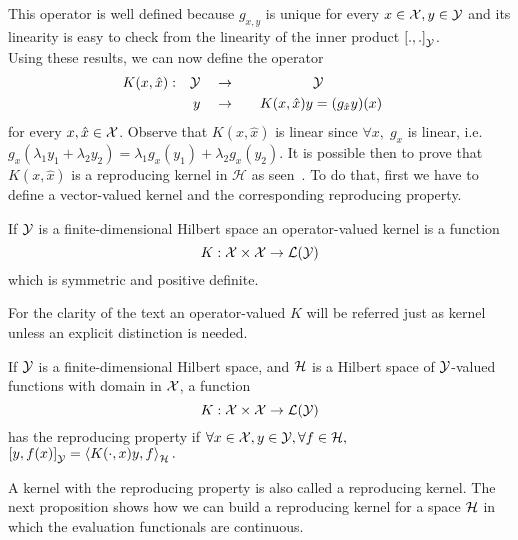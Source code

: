 This operator is well defined because $g_{x, y}$ is unique for every $x \in \mathcal{X}, y \in \mathcal{Y}$ and its linearity is easy to check from the linearity of the inner product $\left[ ., . \right]_\mathcal{Y}$.\\
%
Using these results, we can now define the operator
\begin{equation}\label{eq:vector_kernel}
    \begin{aligned}
        K(x, \hat{x}) : &&\Yspace&& &\to& &&&\Yspace&& \\
                        && y &&     &\to& &&K(x, \hat{x}) y &= (g_{\hat{x}} y) (x)&&
    \end{aligned}    
\end{equation}
for every $x, \hat{x} \in \mathcal{X}$. Observe that $K(x, \hat{x})$ is linear since $\forall x,\;  g_x$ is linear, i.e. $g_x(\lambda_1 y_1 + \lambda_2 y_2) = \lambda_1 g_x(y_1) + \lambda_2 g_x(y_2)$.
It is possible then to prove that $K(x, \hat{x})$ is a reproducing kernel in $\mathcal{H}$ as seen~\cite[Propositon 2.1]{MicchelliP05}.
To do that, first we have to define a vector-valued kernel and the corresponding reproducing property.
\begin{definition}
    If $\mathcal{Y}$ is a finite-dimensional Hilbert space
     an operator-valued kernel is a function
    \begin{equation}
        \nonumber
        K: \mathcal{X} \times \mathcal{X} \to \mathcal{L}(\mathcal{Y})
    \end{equation}
    which is symmetric and positive definite.
\end{definition}
For the clarity of the text an operator-valued $K$ will be referred just as kernel unless an explicit distinction is needed.
\begin{definition}
    If $\mathcal{Y}$ is a finite-dimensional Hilbert space, and $\mathcal{H}$ is a Hilbert space of $\mathcal{Y}$-valued functions with domain in $\mathcal{X}$, a function
    \begin{equation}
        \nonumber
        K: \mathcal{X} \times \mathcal{X} \to \mathcal{L}(\mathcal{Y})
    \end{equation}
    has the reproducing property if $\forall x \in \mathcal{X}, y \in \mathcal{Y}, \forall f \in \mathcal{H},$ $ \left[ y, f(x) \right]_\mathcal{Y} = \left\langle K(\cdot, x) y, f \right\rangle_{\mathcal{H}}.$ 
\end{definition}
A kernel with the reproducing property is also called a reproducing kernel. The next proposition shows how we can build a reproducing kernel for a space $\mathcal{H}$ in which the evaluation functionals are continuous.
